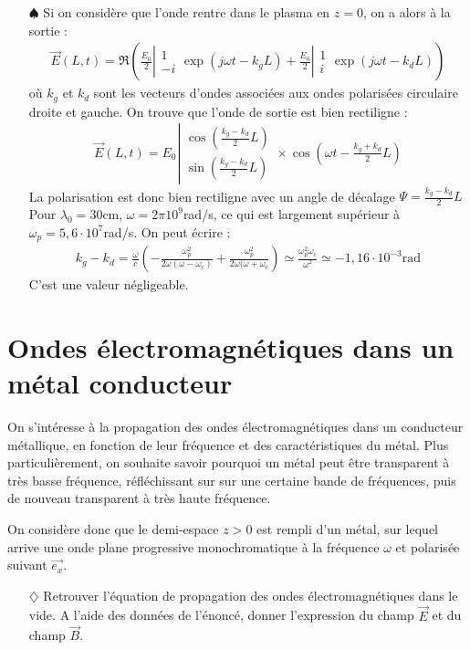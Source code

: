 \documentclass{report}
\newcommand*{\vect}[2]{
	\ensuremath{
    \left\lvert 
      \begin{matrix} 
        #1\\ 
        #2 
      \end{matrix}  
    \right.
  }}
\begin{document}
\begin{itemize}
	\item[$\spadesuit$] Si on considère que l'onde rentre dans le plasma en $z=0$, on a alors à la sortie :
	\begin{align*}
		\vec{E}(L,t)=\Re\left(\frac{E_0}{2}\vect{1}{-i}\exp (j\omega t-k_gL) + \frac{E_0}{2}\vect{1}{i}\exp (j\omega t-k_dL) \right)
	\end{align*}
	où $k_g$ et $k_d$ sont les vecteurs d'ondes associées aux ondes polarisées circulaire droite et gauche. On trouve que l'onde de sortie est bien rectiligne :
		\begin{align*}
		\vec{E}(L,t)=E_0\vect{\cos\left( \frac{k_g-k_d}{2}L\right) }{\sin\left( \frac{k_g-k_d}{2}L\right) }\times\cos\left( \omega t - \frac{k_g+k_d}{2}L\right) 
	\end{align*}
	La polarisation est donc bien rectiligne avec un angle de décalage $\Psi=\frac{k_g-k_d}{2}L$
	Pour $\lambda_0=30$cm, $\omega=2\pi10^9$rad/s, ce qui est largement supérieur à $\omega_p=5,6\cdot10^7$rad/s. On peut écrire :
	\begin{align*}
		k_g-k_d=\frac{\omega}{c}\left(-\frac{\omega_p^2}{2\omega(\omega-\omega_c)}+ \frac{\omega_p^2}{2\omega(\omega+\omega_c}\right) \simeq \frac{\omega_p^2\omega_c}{\omega^2}\simeq-1,16\cdot10^{-3}\mathrm{rad}
	\end{align*}
	C'est une valeur négligeable. 
	
	
	
\end{itemize}

\newpage

\section*{Ondes électromagnétiques dans un métal conducteur}

On s'intéresse à la propagation des ondes électromagnétiques dans un conducteur métallique, en fonction de leur fréquence et des caractéristiques du métal. Plus particulièrement, on souhaite savoir pourquoi un métal peut être transparent à très basse fréquence, réfléchissant sur sur une certaine bande de fréquences, puis de nouveau transparent à très haute fréquence.

On considère donc que le demi-espace $z>0$ est rempli d'un métal, sur lequel arrive une onde plane progressive monochromatique à la fréquence $\omega$ et polarisée suivant $\vec{e_x}$. 

\begin{itemize}

	\item[$\diamondsuit$] Retrouver l'équation de propagation des ondes électromagnétiques dans le vide. A l'aide des données de l'énoncé, donner l'expression du champ $\vec{E}$ et du champ $\vec{B}$.

\end{itemize}
\end{document}

